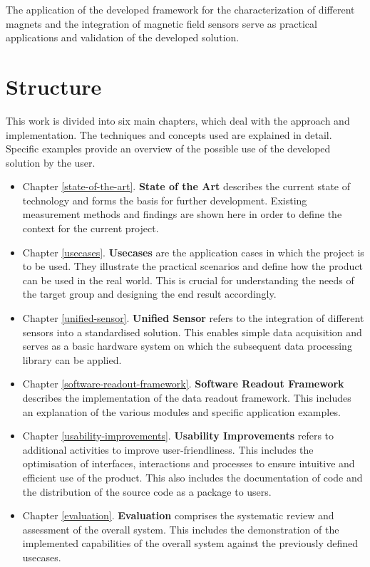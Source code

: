 The application of the developed framework for the characterization of
different magnets and the integration of magnetic field sensors serve as
practical applications and validation of the developed solution.

\hypertarget{structure}{%
\section{Structure}\label{structure}}

This work is divided into six main chapters, which deal with the
approach and implementation. The techniques and concepts used are
explained in detail. Specific examples provide an overview of the
possible use of the developed solution by the user.

\begin{itemize}
\item
  Chapter \ref{state-of-the-art}. \textbf{State of the Art} describes
  the current state of technology and forms the basis for further
  development. Existing measurement methods and findings are shown here
  in order to define the context for the current project.
\item
  Chapter \ref{usecases}. \textbf{Usecases} are the application cases in
  which the project is to be used. They illustrate the practical
  scenarios and define how the product can be used in the real world.
  This is crucial for understanding the needs of the target group and
  designing the end result accordingly.
\item
  Chapter \ref{unified-sensor}. \textbf{Unified Sensor} refers to the
  integration of different sensors into a standardised solution. This
  enables simple data acquisition and serves as a basic hardware system
  on which the subsequent data processing library can be applied.
\item
  Chapter \ref{software-readout-framework}. \textbf{Software Readout
  Framework} describes the implementation of the data readout framework.
  This includes an explanation of the various modules and specific
  application examples.
\item
  Chapter \ref{usability-improvements}. \textbf{Usability Improvements}
  refers to additional activities to improve user-friendliness. This
  includes the optimisation of interfaces, interactions and processes to
  ensure intuitive and efficient use of the product. This also includes
  the documentation of code and the distribution of the source code as a
  package to users.
\item
  Chapter \ref{evaluation}. \textbf{Evaluation} comprises the systematic
  review and assessment of the overall system. This includes the
  demonstration of the implemented capabilities of the overall system
  against the previously defined usecases.
\end{itemize}

